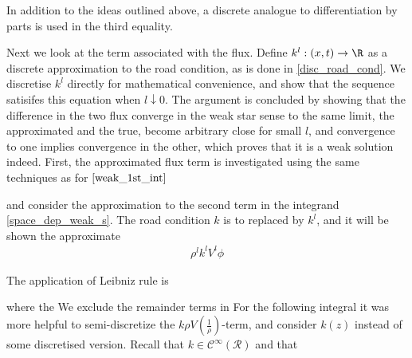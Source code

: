 In addition to the ideas outlined above, a discrete analogue to differentiation by parts is used in the third equality. 

Next we look at the term associated with the flux. Define $k^l: (x,t) \rightarrow \R$ as a discrete approximation to the road condition, as is done in \eqref{disc_road_cond}. We discretise $k^l$ directly for mathematical convenience, and show that the sequence satisifes this equation when $l \downarrow 0$. The argument is concluded by showing that the difference in the two flux converge in the weak star sense to the same limit, the approximated and the true, become arbitrary close for small $l$, and convergence to one implies convergence in the other, which proves that it is a weak solution indeed. First, the approximated flux term is investigated using the same techniques as for $\eqref{weak_1st_int}$


and consider the approximation to the second term in the integrand \eqref{space_dep_weak_s}. The road condition $k$ is to replaced by $k^l$, and it will be shown the approximate 
\begin{align}
    \rho^l k^l V^l \phi 
\end{align}    

 The application of Leibniz rule is 


where the 
We exclude the remainder terms in 
For the following integral it was more helpful to semi-discretize the $k\rho V(\frac{1}{\rho})$-term, and consider $k(z)$ instead of some discretised version. Recall that $k \in \mathscr{C}^{\infty}(\mathscr{R})$ and that 


